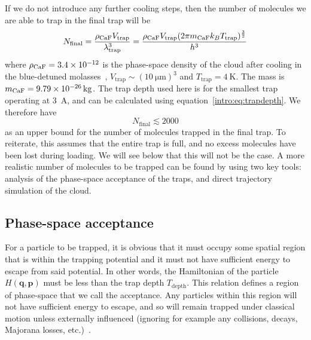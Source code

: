 If we do not introduce any further cooling steps, then the number of molecules
we are able to trap in the final trap will be
%
\begin{equation}
  N_\text{final} = \frac{\rho_\text{CaF{}}V_\text{trap}}
  {\lambda_\text{trap}^3} = \frac{\rho_\text{CaF{}} V_\text{trap}(2 \pi m_\text{CaF} k_B
  T_\text{trap})^\frac{3}{2}}{h^3}
  \label{design:eq:psd_N}
\end{equation}
%
where $\rho_\text{CaF{}} = 3.4\times10^{-12}$ is the phase-space density of
the \CaF{} cloud after cooling in the blue-detuned molasses~\cite{Truppe2017},
$V_\text{trap}\sim(\SI{10}{\micro\meter})^3$ and
$T_\text{trap}=\SI{4}{\kelvin}$. The \CaF{} mass is
$m_\text{CaF{}}=\SI{9.79E-26}{\kilogram}$. The trap depth used here is for the
smallest trap operating at \SI{3}{\ampere}, and can be calculated using
equation~\ref{intro:eq:trapdepth}. We therefore have
%
\begin{equation}
  N_\text{final} \lesssim 2000
\end{equation}
%
as an upper bound for the number of molecules trapped in the final trap. To
reiterate, this assumes that the entire trap is full, and no excess molecules
have been lost during loading. We will see below that this will not be the
case. A more realistic number of molecules to be trapped can be found by using
two key tools: analysis of the phase-space acceptance of the traps, and direct
trajectory simulation of the cloud.

\subsection{Phase-space acceptance}

For a particle to be trapped, it is obvious that it must occupy some spatial
region that is within the trapping potential and it must not have sufficient
energy to escape from said potential. In other words, the Hamiltonian of the
particle $H(\mathbf{q}, \mathbf{p})$ must be less than the trap depth
$T_\text{depth}$.  This relation defines a region of phase-space that we call
the acceptance. Any particles within this region will not have sufficient
energy to escape, and so will remain trapped under classical motion unless
externally influenced (ignoring for example any collisions, decays, Majorana
losses, etc.)~\cite{Lichtenberg1969}.

